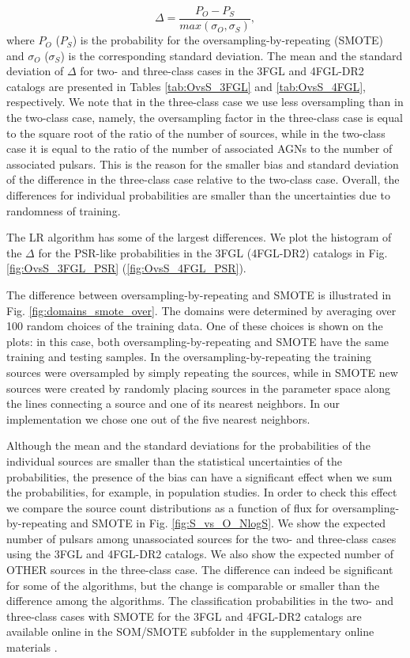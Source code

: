 \documentclass[referee]{aa} %
\newcommand{\be}{\begin{equation}}
\newcommand{\ee}{\end{equation}}
\newcommand{\lb}{\label}
\begin{document}
\begin{appendix}
\be
\lb{eq:OS_diff}
\Delta = \frac{P_O - P_S}{max(\sigma_{O},\sigma_{S})},
\ee
where $P_O$ ($P_S$) is the probability for the oversampling-by-repeating (SMOTE) and $\sigma_O$ ($\sigma_S$) is the corresponding standard deviation. 
The mean and the standard deviation of $\Delta$ for two- and three-class cases in the 3FGL and 4FGL-DR2 catalogs are presented in 
Tables \ref{tab:OvsS_3FGL} and \ref{tab:OvsS_4FGL}, respectively.
We note that in the three-class case we use less oversampling than in the two-class case, namely, the oversampling factor in the three-class case is equal to the square root of the ratio of the number of sources, while in the two-class case it is equal to the ratio of the number of associated AGNs to the number of associated pulsars.
This is the reason for the smaller bias and standard deviation of the difference in the three-class case relative to the two-class case.
Overall, the differences for individual probabilities are smaller than the uncertainties due to randomness of training.


The LR algorithm has some of the largest differences.
We plot the histogram of the $\Delta$ for the PSR-like probabilities in the 3FGL (4FGL-DR2) catalogs in Fig. \ref{fig:OvsS_3FGL_PSR}
(\ref{fig:OvsS_4FGL_PSR}).



The difference between oversampling-by-repeating and SMOTE is illustrated in Fig. \ref{fig:domains_smote_over}.
The domains were determined by averaging over 100 random choices of the training data.
One of these choices is shown on the plots: in this case, both oversampling-by-repeating and SMOTE have the same 
training and testing samples.
In the oversampling-by-repeating the training sources were oversampled by simply repeating the sources,
while in SMOTE new sources were created by randomly placing sources in the parameter space along the lines connecting a source
and one of its nearest neighbors. In our implementation we chose one out of the five nearest neighbors. 




Although the mean and the standard deviations for the probabilities of the individual sources are smaller than the 
statistical uncertainties of the probabilities, the presence of the bias can have a significant effect when we sum the probabilities, for example, in population studies.
In order to check this effect we compare the source count distributions as a function of flux for oversampling-by-repeating and SMOTE 
in Fig. \ref{fig:S_vs_O_NlogS}.
We show the expected number of pulsars among unassociated sources for the two- and three-class cases using the 3FGL and 4FGL-DR2 catalogs.
We also show the expected number of OTHER sources in the three-class case.
The difference can indeed be significant for some of the algorithms, but the change is comparable or smaller than the difference among the algorithms.
The classification probabilities in the two- and three-class cases with SMOTE for the 3FGL and 4FGL-DR2 catalogs 
are available online in the SOM/SMOTE subfolder in the supplementary online materials \citep{SOM_material}.



\end{appendix}
\end{document}
